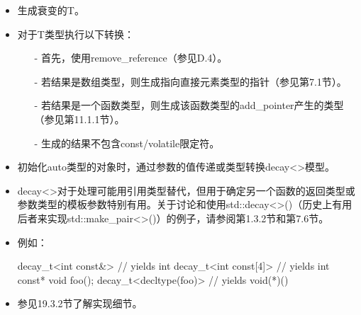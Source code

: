 \begin{itemize}
\item
生成衰变的T。

\item
对于T类型执行以下转换：

\begin{itemize}
\item[-]
首先，使用remove\_reference（参见D.4）。

\item[-]
若结果是数组类型，则生成指向直接元素类型的指针（参见第7.1节）。

\item[-]
若结果是一个函数类型，则生成该函数类型的add\_pointer产生的类型（参见第11.1.1节）。

\item[-]
生成的结果不包含const/volatile限定符。
\end{itemize}

\item
初始化auto类型的对象时，通过参数的值传递或类型转换decay<>模型。

\item
decay<>对于处理可能用引用类型替代，但用于确定另一个函数的返回类型或参数类型的模板参数特别有用。关于讨论和使用std::decay<>()（历史上有用后者来实现std::make\_pair<>()）的例子，请参阅第1.3.2节和第7.6节。

\item
例如：
\begin{cpp}
decay_t<int const&> // yields int
decay_t<int const[4]> // yields int const*
void foo();
decay_t<decltype(foo)> // yields void(*)()
\end{cpp}

\item
参见19.3.2节了解实现细节。
\end{itemize}















